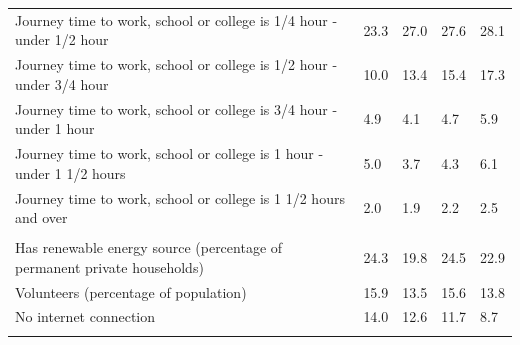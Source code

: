 \documentclass{article}
\begin{document}
\begin{table}[h]
\begin{tabular}{KTTTT}
Journey time to work, school or college is 1/4 hour - under 1/2 hour & 23.3& 27.0& 27.6& 28.1\\
Journey time to work, school or college is 1/2 hour - under 3/4 hour & 10.0& 13.4& 15.4& 17.3\\
Journey time to work, school or college is 3/4 hour - under 1 hour & 4.9& 4.1& 4.7& 5.9\\
Journey time to work, school or college is 1 hour - under 1 1/2 hours & 5.0& 3.7& 4.3& 6.1\\
Journey time to work, school or college is 1 1/2 hours and over & 2.0& 1.9& 2.2& 2.5\\
\hline
    \\ 
    \hline
Has renewable energy source (percentage of permanent private households) & 24.3& 19.8& 24.5& 22.9\\
    \hline
Volunteers (percentage of population) & 15.9& 13.5& 15.6& 13.8\\
    \hline
No internet connection& 14.0& 12.6& 11.7&  8.7\\
\hline
\end{tabular}
\end{table}
\end{document}
